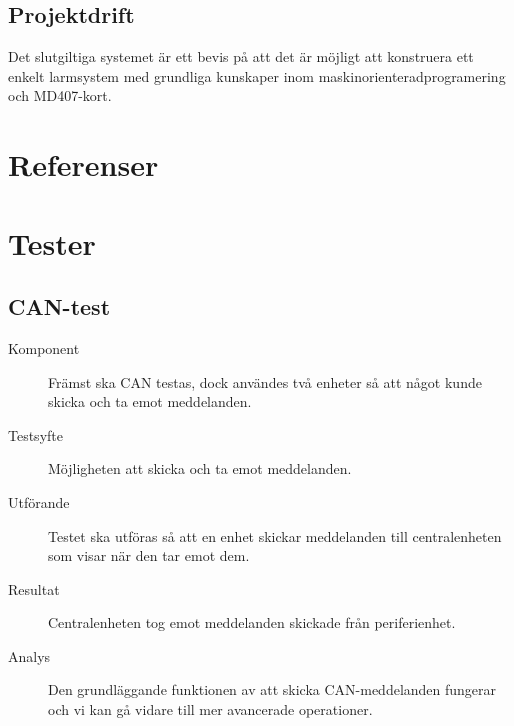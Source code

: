 \documentclass[a4paper]{article}
\begin{document}
\subsection{Projektdrift}
Det slutgiltiga systemet är ett bevis på att det är möjligt att konstruera ett enkelt larmsystem med grundliga kunskaper inom maskinorienteradprogramering och MD407-kort.

\section{Referenser}
\printbibliography[heading=none]

\newpage
\appendix
\section{Tester}
\subsection{CAN-test}
\begin{description}
\item[Komponent] Främst ska CAN testas, dock användes två enheter så att något kunde skicka och ta emot meddelanden.

\item[Testsyfte] Möjligheten att skicka och ta emot meddelanden.

\item[Utförande] Testet ska utföras så att en enhet skickar meddelanden till centralenheten som visar när den tar emot dem.

\item[Resultat] Centralenheten tog emot meddelanden skickade från periferienhet.

\item[Analys] Den grundläggande funktionen av att skicka CAN-meddelanden fungerar och vi kan gå vidare till mer avancerade operationer.
\end{description}
\end{document}
